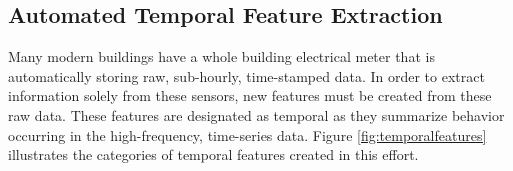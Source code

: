 \subsection{Automated Temporal Feature Extraction}
Many modern buildings have a whole building electrical meter that is automatically storing raw, sub-hourly, time-stamped data. In order to extract information solely from these sensors, new features must be created from these raw data.  These features are designated as temporal as they summarize behavior occurring in the high-frequency, time-series data. Figure \ref{fig:temporalfeatures} illustrates the categories of temporal features created in this effort.

